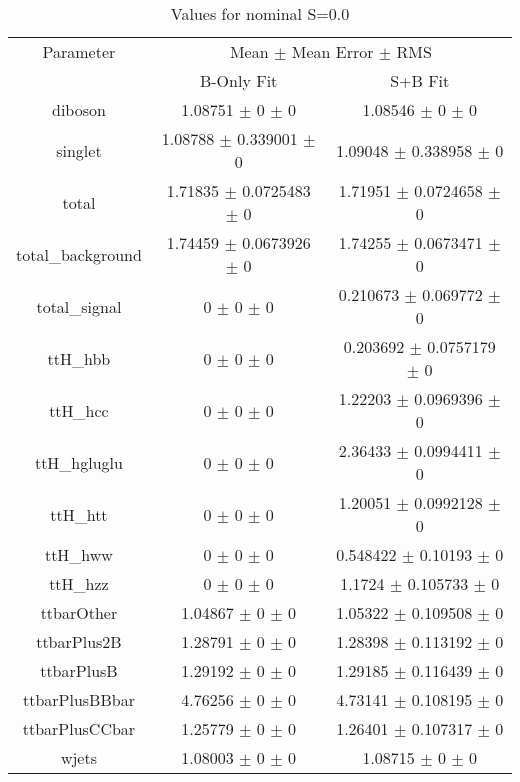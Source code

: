 \begin{table}
\centering
\caption{Values for nominal S=0.0}
\begin{tabular}{ccc}
\toprule
Parameter & \multicolumn{2}{c}{Mean $\pm$ Mean Error $\pm$ RMS}\\
 & B-Only Fit & S+B Fit\\
\midrule
diboson & \num{1.08751} $\pm$ \num{0} $\pm$ \num{0} & \num{1.08546} $\pm$ \num{0} $\pm$ \num{0}\\
singlet & \num{1.08788} $\pm$ \num{0.339001} $\pm$ \num{0} & \num{1.09048} $\pm$ \num{0.338958} $\pm$ \num{0}\\
total & \num{1.71835} $\pm$ \num{0.0725483} $\pm$ \num{0} & \num{1.71951} $\pm$ \num{0.0724658} $\pm$ \num{0}\\
total\_background & \num{1.74459} $\pm$ \num{0.0673926} $\pm$ \num{0} & \num{1.74255} $\pm$ \num{0.0673471} $\pm$ \num{0}\\
total\_signal & \num{0} $\pm$ \num{0} $\pm$ \num{0} & \num{0.210673} $\pm$ \num{0.069772} $\pm$ \num{0}\\
ttH\_hbb & \num{0} $\pm$ \num{0} $\pm$ \num{0} & \num{0.203692} $\pm$ \num{0.0757179} $\pm$ \num{0}\\
ttH\_hcc & \num{0} $\pm$ \num{0} $\pm$ \num{0} & \num{1.22203} $\pm$ \num{0.0969396} $\pm$ \num{0}\\
ttH\_hgluglu & \num{0} $\pm$ \num{0} $\pm$ \num{0} & \num{2.36433} $\pm$ \num{0.0994411} $\pm$ \num{0}\\
ttH\_htt & \num{0} $\pm$ \num{0} $\pm$ \num{0} & \num{1.20051} $\pm$ \num{0.0992128} $\pm$ \num{0}\\
ttH\_hww & \num{0} $\pm$ \num{0} $\pm$ \num{0} & \num{0.548422} $\pm$ \num{0.10193} $\pm$ \num{0}\\
ttH\_hzz & \num{0} $\pm$ \num{0} $\pm$ \num{0} & \num{1.1724} $\pm$ \num{0.105733} $\pm$ \num{0}\\
ttbarOther & \num{1.04867} $\pm$ \num{0} $\pm$ \num{0} & \num{1.05322} $\pm$ \num{0.109508} $\pm$ \num{0}\\
ttbarPlus2B & \num{1.28791} $\pm$ \num{0} $\pm$ \num{0} & \num{1.28398} $\pm$ \num{0.113192} $\pm$ \num{0}\\
ttbarPlusB & \num{1.29192} $\pm$ \num{0} $\pm$ \num{0} & \num{1.29185} $\pm$ \num{0.116439} $\pm$ \num{0}\\
ttbarPlusBBbar & \num{4.76256} $\pm$ \num{0} $\pm$ \num{0} & \num{4.73141} $\pm$ \num{0.108195} $\pm$ \num{0}\\
ttbarPlusCCbar & \num{1.25779} $\pm$ \num{0} $\pm$ \num{0} & \num{1.26401} $\pm$ \num{0.107317} $\pm$ \num{0}\\
wjets & \num{1.08003} $\pm$ \num{0} $\pm$ \num{0} & \num{1.08715} $\pm$ \num{0} $\pm$ \num{0}\\
\bottomrule
\end{tabular}
\end{table}